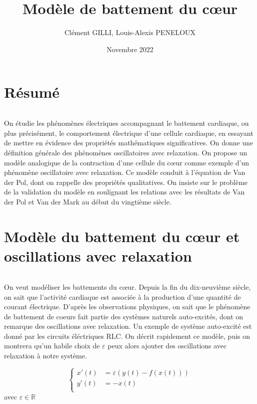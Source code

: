\documentclass{article}
\title{{\myfont Modèle de battement du cœur}}
\author{Clément GILLI, Louis-Alexis PENELOUX }
\date{Novembre 2022}
\begin{document}
\maketitle

\section{Résumé}

\[\]

On étudie les phénomènes électriques accompagnant le battement cardiaque, ou
plus précisément, le comportement électrique d’une cellule cardiaque, en essayant de mettre en
évidence des propriétés mathématiques significatives. On donne une définition générale des
phénomènes oscillatoires avec relaxation. On propose un modèle analogique de la contraction
d’une cellule du cœur comme exemple d’un phénomène oscillatoire avec relaxation. Ce
modèle conduit à l’équation de Van der Pol, dont on rappelle des propriétés qualitatives. On
insiste sur le problème de la validation du modèle en soulignant les relations avec les résultats
de Van der Pol et Van der Mark au début du vingtième siècle.

\section{Modèle du battement du cœur et oscillations avec relaxation}

\[\]

On veut modéliser les battements du cœur. Depuis la fin du dix-neuvième siècle, on sait que l’activité cardiaque est associée à la production d’une quantité de courant électrique.
D'après les observations physiques, on sait que le phénomène de battement de coeurs fait partie des systèmes naturels auto-excités, dont on remarque des oscillations avec relaxation. Un exemple de système auto-excité est donné par les circuits éléctriques  RLC. On décrit rapidement ce modèle, puis on montrera qu'un habile choix de $\varepsilon$ peux alors ajouter des oscillations avec relaxation à notre système.


\begin{equation}
   \left\{
   \begin{aligned}
        x'(t) &= \varepsilon (y(t) - f(x(t)))\\   
        y'(t) &= -x(t)\\
   \end{aligned}
   \right.
\end{equation}
avec $\varepsilon \in \mathbb{R}$
\end{document}
